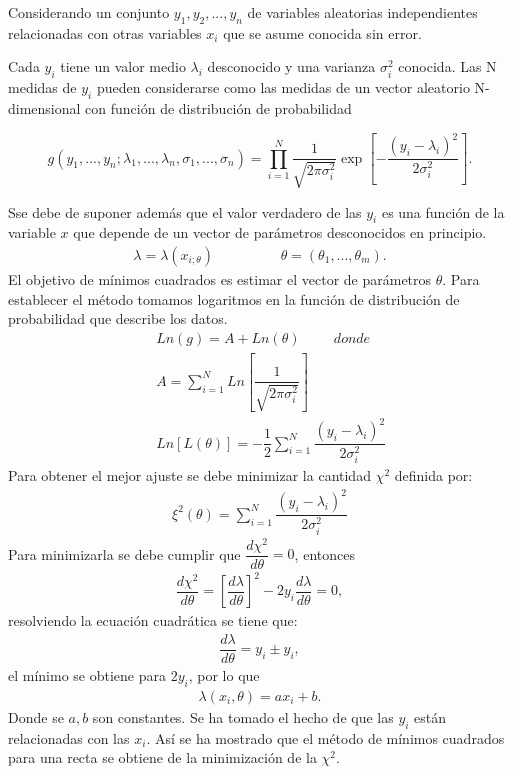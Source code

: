 \documentclass{report}
\begin{document}
	Considerando un conjunto $ y_{1}, y_{2},..., y_{n} $ de variables aleatorias independientes relacionadas con otras variables $ x_{i} $ que se asume conocida sin error. 
	
	Cada $ y_{i} $ tiene un valor medio $ \lambda_{i} $ desconocido y una varianza $ \sigma_{i}^{2} $ conocida. Las N medidas de $ y_{i} $ pueden considerarse como las medidas de un vector aleatorio N-dimensional con funci\'on de distribuci\'on de probabilidad
	
	\begin{equation*}
		g(y_{1},...,y_{n}; \lambda_{1},..., \lambda_{n}, \sigma_{1},..., \sigma_{n})=\prod_{i=1}^{N}\dfrac{1}{\sqrt{2\pi\sigma_{i}^{2}}}\exp\left [-\dfrac{(y_{i}-\lambda_{i})^{2}}{2\sigma_{i}^{2}}\right ].
	\end{equation*}
	
	Sse debe de suponer adem\'as que el valor verdadero de las $ y_{i} $ es una funci\'on de la variable $ x $ que depende de un vector de par\'ametros desconocidos en principio.
	\begin{eqnarray*}
		\lambda=\lambda(x_{i;\theta})\hspace{2cm} \theta=(\theta_{1},...,\theta_{m}).
	\end{eqnarray*} 
	El objetivo de m\'inimos cuadrados es estimar el vector de par\'ametros $ \theta $. Para establecer el m\'etodo tomamos logaritmos en la funci\'on de distribuci\'on de probabilidad que describe los datos.
	\begin{eqnarray*}
		&& Ln(g)=A+Ln(\theta) \hspace{1cm}donde \\ && A=\sum_{i=1}^{N}Ln\left [\dfrac{1}{\sqrt{2\pi\sigma_{i}^{2}}}\right ] \\ && Ln[L(\theta)]=-\dfrac{1}{2}\sum_{i=1}^{N}\dfrac{(y_{i}-\lambda_{i})^{2}}{2\sigma_{i}^{2}}
	\end{eqnarray*}  
	Para obtener el mejor ajuste se debe minimizar la cantidad $ \chi^{2} $ definida por:
	\begin{eqnarray*}
		\xi^{2}(\theta)=\sum_{i=1}^{N}\dfrac{(y_{i}-\lambda_{i})^{2}}{2\sigma_{i}^{2}}
	\end{eqnarray*}
	Para minimizarla se debe cumplir que $ \dfrac{d\chi^{2}}{d\theta}=0 $, entonces
	\begin{eqnarray*}
		\dfrac{d\chi^{2}}{d\theta}=\left [\dfrac{d\lambda}{d\theta}\right ]^{2}-2y_{i}\dfrac{d\lambda}{d\theta}=0,
	\end{eqnarray*}
	resolviendo la ecuaci\'on cuadr\'atica se tiene que:
	\begin{eqnarray*}
		\dfrac{d\lambda}{d\theta}=y_{i}\pm y_{i},
	\end{eqnarray*}
	el m\'inimo se obtiene para $ 2y_{i} $, por lo que
	\begin{eqnarray*}
		\lambda(x_{i},\theta)=ax_{i}+b.
	\end{eqnarray*}
	Donde se $ a,b $ son constantes. Se ha tomado el hecho de que las $ y_{i} $ est\'an relacionadas con las $ x_{i} $. As\'i se ha mostrado que el m\'etodo de m\'inimos cuadrados para una recta se obtiene de la minimizaci\'on de la $ \chi^{2} $. 
\end{document}
